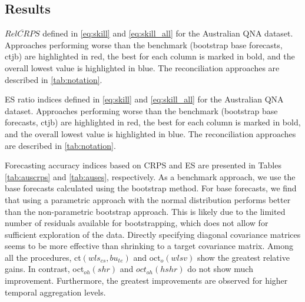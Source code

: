 \documentclass[a4paper,11pt]{article}
\theoremstyle{definition}
\begin{document}
\subsection{Results}\label{ssec:ausresults}

\begin{table}[!t]
	\centering
	\begingroup
	\fontsize{9}{11}\selectfont
	
	\endgroup
	\caption{$\overline{RelCRPS}$ defined in \eqref{eq:skill} and \eqref{eq:skill_all} for the Australian QNA dataset. Approaches performing worse than the benchmark (bootstrap base forecasts, ctjb) are highlighted in red, the best for each column is marked in bold, and the overall lowest value is highlighted in blue. The reconciliation approaches are described in \autoref{tab:notation}.}
	\label{tab:auscrps}
\end{table}
\begin{table}[!t]
	\centering
	\begingroup
	\fontsize{9}{11}\selectfont
	
	\endgroup
	\caption{ES ratio indices defined in \eqref{eq:skill} and \eqref{eq:skill_all} for the Australian QNA dataset. Approaches performing worse than the benchmark (bootstrap base forecasts, ctjb) are highlighted in red, the best for each column is marked in bold, and the overall lowest value is highlighted in blue. The reconciliation approaches are described in \autoref{tab:notation}.}
	\label{tab:auses}
\end{table}

Forecasting accuracy indices based on CRPS and ES are presented in Tables \ref{tab:auscrps} and \ref{tab:auses}, respectively. As a benchmark approach, we use the base forecasts calculated using the bootstrap method. For base forecasts, we find that using a parametric approach with the normal distribution performs better than the non-parametric bootstrap approach. This is likely due to the limited number of residuals available for bootstrapping, which does not allow for sufficient exploration of the data. Directly specifying diagonal covariance matrices seems to be more effective than shrinking to a target covariance matrix. Among all the procedures, ct$(wls_{cs},bu_{te})$ and oct$_o(wlsv)$ show the greatest relative gains. In contrast, oct$_{oh}(shr)$ and $oct_{oh}(hshr)$ do not show much improvement. Furthermore, the greatest improvements are observed for higher temporal aggregation levels.
\end{document}

